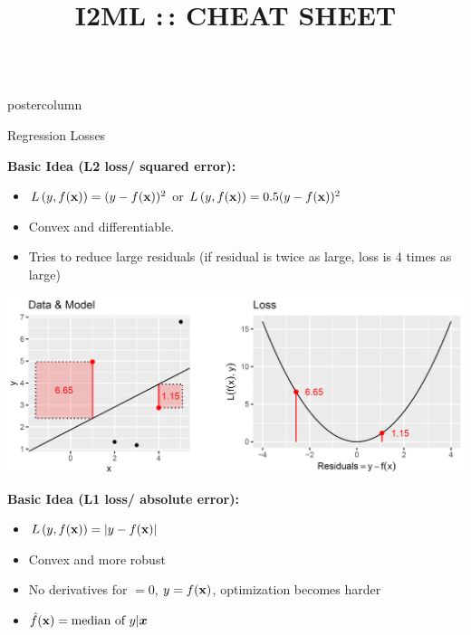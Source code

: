 \documentclass{beamer}
\title{I2ML :\,: CHEAT SHEET} %
\newlength{\columnheight} %
\begin{document}
\begin{frame}[fragile]{}
\begin{columns}
	\begin{column}{.31\textwidth}
		\begin{beamercolorbox}[center]{postercolumn}
			\begin{minipage}{.98\textwidth}
				\parbox[t][\columnheight]{\textwidth}{
					\begin{myblock}{Regression Losses}
						\begin{codebox}
			\textbf{Basic Idea (L2 loss/ squared error):}
						\end{codebox}
						
						\begin{itemize}[$\bullet$]     
						\setlength{\itemindent}{+.3in}
              \item $L\left(y, f(\mathbf{x})\right) = (y-f(\mathbf{x}))^2$ or $L\left(y, f(\mathbf{x})\right) = 0.5 (y-f(\mathbf{x}))^2$
              \item Convex and differentiable.
              \item Tries to reduce large residuals (if residual is twice as large, loss is 4 times as large)      
            \end{itemize}

            \vspace*{1ex}
            \includegraphics[width=1\columnwidth]{img/reg_loss.PNG}

\begin{codebox}
\textbf{Basic Idea (L1 loss/ absolute error):}
\end{codebox}

\begin{itemize}[$\bullet$]     \setlength{\itemindent}{+.3in}
\item $L\left(y, f(\mathbf{x})\right) = |y-f(\mathbf{x})|$
  \item Convex and more robust
\item No derivatives for $ = 0$, $y = f(\mathbf{x})$, optimization becomes harder
\item $\hat{f}(\mathbf{x}) = \text{median of } y | \bm{x}$      
  \end{itemize}


\end{myblock}}
\end{minipage}
\end{beamercolorbox}
\end{column}
\end{columns}
\end{frame}
\end{document}
